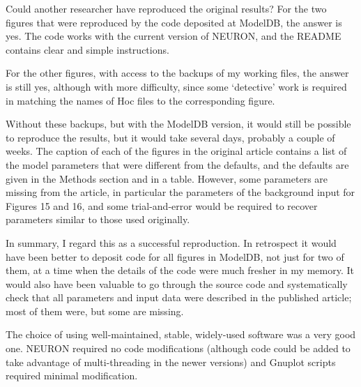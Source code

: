 Could another researcher have reproduced the original results?
For the two figures that were reproduced by the code deposited at ModelDB, the answer is yes.
The code works with the current version of NEURON, and the README contains clear and simple instructions.

For the other figures, with access to the backups of my working files, the answer is still yes, although with more difficulty,
since some `detective' work is required in matching the names of Hoc files to the corresponding figure.

Without these backups, but with the ModelDB version, it would still be possible to reproduce the results,
but it would take several days, probably a couple of weeks.
The caption of each of the figures in the original article contains a list of the model parameters that were different from the defaults,
and the defaults are given in the Methods section and in a table.
However, some parameters are missing from the article, in particular the parameters of the background input for Figures 15 and 16,
and some trial-and-error would be required to recover parameters similar to those used originally.


In summary, I regard this as a successful reproduction.
In retrospect it would have been better to deposit code for all figures in ModelDB, not just for two of them,
at a time when the details of the code were much fresher in my memory.
It would also have been valuable to go through the source code and systematically check that all parameters and input data
were described in the published article; most of them were, but some are missing.

The choice of using well-maintained, stable, widely-used software was a very good one.
NEURON required no code modifications (although code could be added to take advantage of multi-threading in the newer versions)
and Gnuplot scripts required minimal modification.
